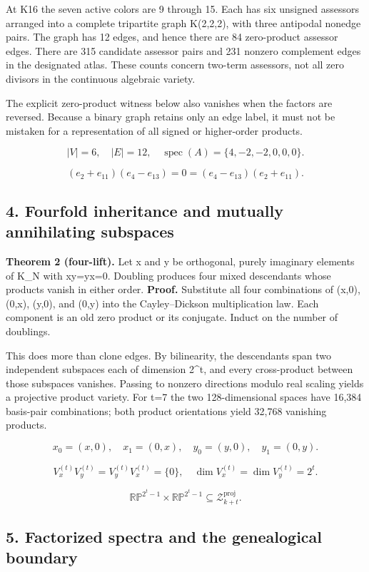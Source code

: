 \documentclass[
  10pt,
]{article}
\begin{document}
At K16 the seven active colors are 9 through 15. Each has six unsigned
assessors arranged into a complete tripartite graph K(2,2,2), with three
antipodal nonedge pairs. The graph has 12 edges, and hence there are 84
zero-product assessor edges. There are 315 candidate assessor pairs and
231 nonzero complement edges in the designated atlas. These counts
concern two-term assessors, not all zero divisors in the continuous
algebraic variety.

The explicit zero-product witness below also vanishes when the factors
are reversed. Because a binary graph retains only an edge label, it must
not be mistaken for a representation of all signed or higher-order
products.

\[
|V|=6,\quad |E|=12,\quad\operatorname{spec}(A)=\{4,-2,-2,0,0,0\}.
\tag{6}
\]

\[
(e_2+e_{11})(e_4-e_{13})=0=(e_4-e_{13})(e_2+e_{11}).
\tag{7}
\]

\subsection{4. Fourfold inheritance and mutually annihilating
subspaces}\label{fourfold-inheritance-and-mutually-annihilating-subspaces}

\textbf{Theorem 2 (four-lift).} Let x and y be orthogonal, purely
imaginary elements of K\_N with xy=yx=0. Doubling produces four mixed
descendants whose products vanish in either order. \textbf{Proof.}
Substitute all four combinations of (x,0), (0,x), (y,0), and (0,y) into
the Cayley--Dickson multiplication law. Each component is an old zero
product or its conjugate. Induct on the number of doublings.

This does more than clone edges. By bilinearity, the descendants span
two independent subspaces each of dimension 2\^{}t, and every
cross-product between those subspaces vanishes. Passing to nonzero
directions modulo real scaling yields a projective product variety. For
t=7 the two 128-dimensional spaces have 16,384 basis-pair combinations;
both product orientations yield 32,768 vanishing products.

\[
x_0=(x,0),\quad x_1=(0,x),\quad y_0=(y,0),\quad y_1=(0,y).
\]

\[
V_x^{(t)}V_y^{(t)}=V_y^{(t)}V_x^{(t)}=\{0\},\quad
\dim V_x^{(t)}=\dim V_y^{(t)}=2^t.
\tag{8}
\]

\[
\mathbb{RP}^{2^t-1}\times\mathbb{RP}^{2^t-1}\subseteq\mathscr Z_{k+t}^{\mathrm{proj}}.
\tag{9}
\]

\subsection{5. Factorized spectra and the genealogical
boundary}\label{factorized-spectra-and-the-genealogical-boundary}
\end{document}

